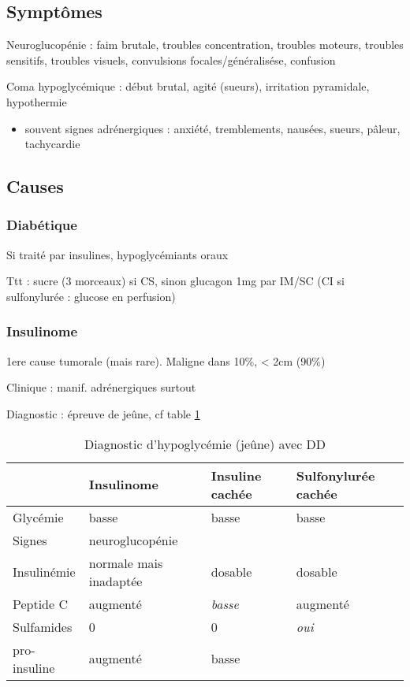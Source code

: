 \documentclass{book}
\begin{document}
\subsection{Symptômes}
\label{sec:org4786f9e}
Neuroglucopénie : faim brutale, troubles concentration, troubles moteurs,
troubles sensitifs, troubles visuels, convulsions focales/généralisése,
confusion

Coma hypoglycémique : début brutal, agité (sueurs), irritation pyramidale, hypothermie

\begin{itemize}
\item souvent signes adrénergiques : anxiété, tremblements, nausées, sueurs,
pâleur, tachycardie
\end{itemize}

\subsection{Causes}
\label{sec:orgfd43c5c}
\subsubsection{Diabétique}
\label{sec:orge70945f}
Si traité par insulines, hypoglycémiants oraux

Ttt : sucre (3 morceaux) si CS, sinon glucagon 1mg par IM/SC (CI si
sulfonylurée : glucose en perfusion)

\subsubsection{Insulinome}
\label{sec:org9d139aa}
1ere cause tumorale (mais rare). Maligne dans 10\%, < 2cm (90\%)

Clinique : manif. adrénergiques surtout

Diagnostic : épreuve de jeûne, cf table \ref{tab:orgefdee58}

\begin{table}[htbp]
\caption{\label{tab:orgefdee58}
Diagnostic d'hypoglycémie (jeûne) avec DD}
\centering
\begin{tabular}{llll}
\toprule
 & Insulinome & Insuline cachée & Sulfonylurée cachée\\
\midrule
Glycémie & basse & basse & basse\\
Signes & neuroglucopénie &  & \\
Insulinémie & normale mais inadaptée & dosable & dosable\\
Peptide C & augmenté & \emph{basse} & augmenté\\
Sulfamides & 0 & 0 & \emph{oui}\\
pro-insuline & augmenté & basse & \\
\bottomrule
\end{tabular}
\end{table}
\end{document}
